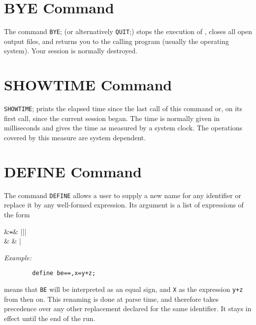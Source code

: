 \hypertarget{command:QUIT}{}
\hypertarget{command:BYE}{\section{BYE Command}}

The command \texttt{BYE}; (or alternatively \texttt{QUIT};)
stops the execution
of {\REDUCE}, closes all open output files, and returns you to the calling
program (usually the operating system).  Your {\REDUCE} session is
normally destroyed.

\section{SHOWTIME Command}
\hypertarget{command:SHOWTIME}{}

\texttt{SHOWTIME}; prints the elapsed time since the last call of this
command or, on its first call, since the current {\REDUCE} session began.
The time is normally given in milliseconds and gives the time as measured
by a system clock.  The operations covered by this measure are system
dependent.

\section{DEFINE Command}
\hypertarget{command:DEFINE}{}

The command \texttt{DEFINE} allows a user to supply a new name for
any identifier or replace it by any well-formed expression.  Its argument
is a list of expressions of the form
\begin{syntaxtable}
   &\texttt{=}& |||\\
                    &          & |
\end{syntaxtable}

\textit{Example:}
\begin{verbatim}
        define be==,x=y+z;
\end{verbatim}
means that \texttt{BE} will be interpreted as an equal sign, and \texttt{X}
as the expression \texttt{y+z} from then on.  This renaming is done at parse
time, and therefore takes precedence over any other replacement declared
for the same identifier.  It stays in effect until the end of the
{\REDUCE} run.

